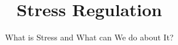 \documentclass{beamer}
\begin{document}
% 


\title[Stress regulation]{Stress Regulation} %
\subtitle{What is Stress and What can We do about It?}








 \begin{frame}
\titlepage %
\end{frame}

\maketitle



\end{document}
